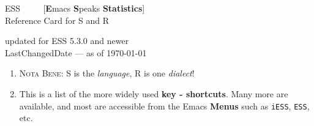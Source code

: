 \documentclass[a4paper]{article}
\begin{document}
\begin{center}
  {\LARGE ESS \ \ \ \ {\large
      [\textbf{E}macs \textbf{S}peaks \textbf{Statistics}]}
      \\[.5ex] Reference Card for S and R}

  \smallskip

  {\small updated for ESS 5.3.0 and newer}%
  \\[1ex] {\tiny $ $LastChangedDate$ $}
           \footnotesize --- as of \today
\end{center}
\begin{enumerate}
\item  \textsc{Nota Bene:} S is the \emph{language},
  R is one \emph{dialect}!
\item This is a list of the more widely used \textbf{key - shortcuts}.
  Many more are available, and most are accessible from the Emacs
  \textbf{Menus} such as \texttt{iESS}, \texttt{ESS}, etc.
\end{enumerate}
\end{document}
